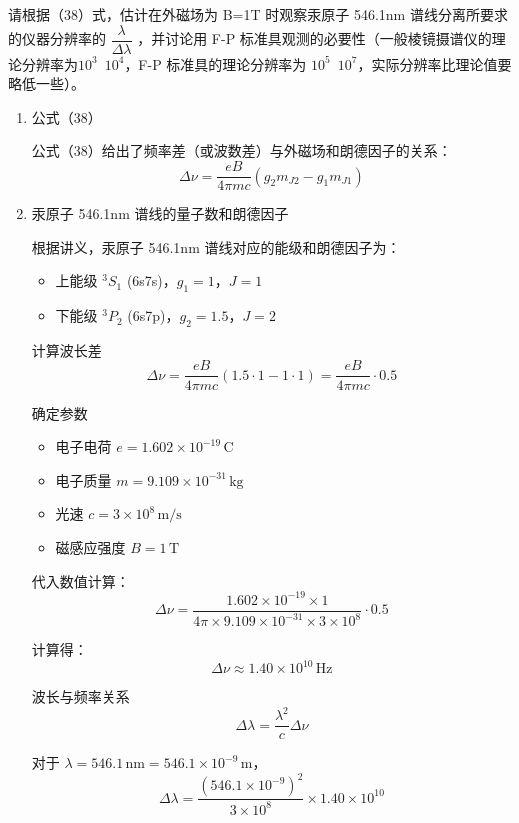 \documentclass[dvipsnames, svgnames,a4paper,11pt]{article}
\begin{document}
	\begin{question}
		请根据（38）式，估计在外磁场为 B=1T 时观察汞原子 546.1nm 谱线分离所要求的仪器分辨率的 $\dfrac{\lambda}{\Delta \lambda}$ ，并讨论用 F-P 标准具观测的必要性（一般棱镜摄谱仪的理论分辨率为$10^3$~$10^4$，F-P 标准具的理论分辨率为 $10^5$~$10^7$，实际分辨率比理论值要略低一些）。
	\end{question}
	\begin{enumerate}
		\item 公式（38）
		
		公式（38）给出了频率差（或波数差）与外磁场和朗德因子的关系：
		\[ \Delta \nu = \frac{e B}{4 \pi m c} (g_2 m_{J2} - g_1 m_{J1}) \]
		
		\item 汞原子 546.1nm 谱线的量子数和朗德因子
		
		根据讲义，汞原子 546.1nm 谱线对应的能级和朗德因子为：
		\begin{itemize}
			\item 上能级 \( ^3S_1 \) (6s7s)，\( g_1 = 1 \)，\( J = 1 \)
			\item 下能级 \( ^3P_2 \) (6s7p)，\( g_2 = 1.5 \)，\( J = 2 \)
		\end{itemize}
		
		计算波长差
		\[ \Delta \nu = \frac{e B}{4 \pi m c} (1.5 \cdot 1 - 1 \cdot 1) = \frac{e B}{4 \pi m c} \cdot 0.5 \]
		
		确定参数
		\begin{itemize}
			\item 电子电荷 \( e = 1.602 \times 10^{-19} \, \text{C} \)
			\item 电子质量 \( m = 9.109 \times 10^{-31} \, \text{kg} \)
			\item 光速 \( c = 3 \times 10^8 \, \text{m/s} \)
			\item 磁感应强度 \( B = 1 \, \text{T} \)
		\end{itemize}
		
		代入数值计算：
		\[ \Delta \nu = \frac{1.602 \times 10^{-19} \times 1}{4 \pi \times 9.109 \times 10^{-31} \times 3 \times 10^8} \cdot 0.5 \]
		
		计算得：
		\[ \Delta \nu \approx 1.40 \times 10^{10} \, \text{Hz} \]
		
		波长与频率关系
		\[ \Delta \lambda = \frac{\lambda^2}{c} \Delta \nu \]
		
		对于 \( \lambda = 546.1 \, \text{nm} = 546.1 \times 10^{-9} \, \text{m} \)，
		\[ \Delta \lambda = \frac{(546.1 \times 10^{-9})^2}{3 \times 10^8} \times 1.40 \times 10^{10} \]
		

\end{enumerate}
\end{document}
